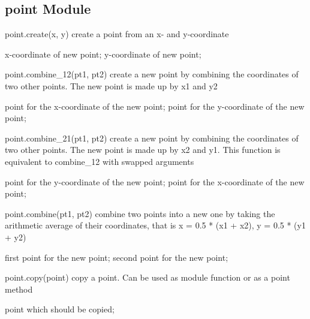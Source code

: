 \subsection{point Module}
\begin{APIfunc}{point.create(x, y)}
    create a point from an x- and y-coordinate
    \begin{APIparameters}
            x-coordinate of new point;
            y-coordinate of new point;
    \end{APIparameters}
\end{APIfunc}
\begin{APIfunc}{point.combine\_12(pt1, pt2)}
    create a new point by combining the coordinates of two other points. The new point is made up by x1 and y2
    \begin{APIparameters}
            point for the x-coordinate of the new point;
            point for the y-coordinate of the new point;
    \end{APIparameters}
\end{APIfunc}
\begin{APIfunc}{point.combine\_21(pt1, pt2)}
    create a new point by combining the coordinates of two other points. The new point is made up by x2 and y1. This function is equivalent to combine\_12 with swapped arguments
    \begin{APIparameters}
            point for the y-coordinate of the new point;
            point for the x-coordinate of the new point;
    \end{APIparameters}
\end{APIfunc}
\begin{APIfunc}{point.combine(pt1, pt2)}
    combine two points into a new one by taking the arithmetic average of their coordinates, that is x = 0.5 * (x1 + x2), y = 0.5 * (y1 + y2)
    \begin{APIparameters}
            first point for the new point;
            second point for the new point;
    \end{APIparameters}
\end{APIfunc}
\begin{APIfunc}{point.copy(point)}
    copy a point. Can be used as module function or as a point method
    \begin{APIparameters}
            point which should be copied;
    \end{APIparameters}
\end{APIfunc}
